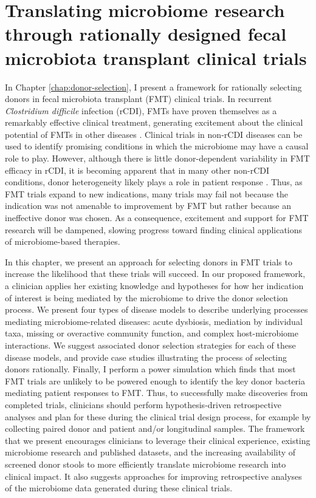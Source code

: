 \section{Translating microbiome research through rationally designed fecal microbiota transplant clinical trials}

In Chapter \ref{chap:donor-selection}, I present a framework for rationally selecting donors in fecal microbiota transplant (FMT) clinical trials.
In recurrent \textit{Clostridium difficile} infection (rCDI), FMTs have proven themselves as a remarkably effective clinical treatment, generating excitement about the clinical potential of FMTs in other diseases \cite{quraishi-2017-rcdifmt,bafeta-2017-fmt}.
Clinical trials in non-rCDI diseases can be used to identify promising conditions in which the microbiome may have a causal role to play.
However, although there is little donor-dependent variability in FMT efficacy in rCDI, it is becoming apparent that in many other non-rCDI conditions, donor heterogeneity likely plays a role in patient response \cite{moayyedi-2015,olesen-2018-superstool}.
Thus, as FMT trials expand to new indications, many trials may fail not because the indication was not amenable to improvement by FMT but rather because an ineffective donor was chosen.
As a consequence, excitement and support for FMT research will be dampened, slowing progress toward finding clinical applications of microbiome-based therapies.

In this chapter, we present an approach for selecting donors in FMT trials to increase the likelihood that these trials will succeed.
In our proposed framework, a clinician applies her existing knowledge and hypotheses for how her indication of interest is being mediated by the microbiome to drive the donor selection process.
We present four types of disease models to describe underlying processes mediating microbiome-related diseases: acute dysbiosis, mediation by individual taxa, missing or overactive community function, and complex host-microbiome interactions.
We suggest associated donor selection strategies for each of these disease models, and provide case studies illustrating the process of selecting donors rationally.
Finally, I perform a power simulation which finds that most FMT trials are unlikely to be powered enough to identify the key donor bacteria mediating patient responses to FMT.
Thus, to successfully make discoveries from completed trials, clinicians should perform hypothesis-driven retrospective analyses and plan for these during the clinical trial design process, for example by collecting paired donor and patient and/or longitudinal samples.
The framework that we present encourages clinicians to leverage their clinical experience, existing microbiome research and published datasets, and the increasing availability of screened donor stools to more efficiently translate microbiome research into clinical impact.
It also suggests approaches for improving retrospective analyses of the microbiome data generated during these clinical trials.

